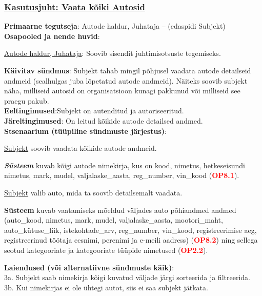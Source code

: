 \begin{shaded}
	\subsubsection{\underline{Kasutusjuht: Vaata kõiki Autosid}}
	\textbf{Primaarne tegutseja}: Autode haldur, Juhataja – (edaspidi Subjekt) \\
	\textbf{Osapooled ja nende huvid}: 
	\useDash
	\begin{myitemize}
		\item \underline{Autode haldur, Juhataja}: Soovib sisendit juhtimisotsuste tegemiseks.
	\end{myitemize}
	\textbf{Käivitav sündmus}: Subjekt tahab mingil põhjusel vaadata autode detailseid andmeid (sealhulgas juba lõpetatud autode andmeid). Näiteks soovib subjekt näha, milliseid autosid on organisatsioon kunagi pakkunud või milliseid see praegu pakub. \\
	\textbf{Eeltingimused}:Subjekt on autenditud ja autoriseeritud.\\
	\textbf{Järeltingimused}: On leitud kõikide autode detailsed andmed. \\
	\textbf{Stsenaarium (tüüpiline sündmuste järjestus)}:
	\begin{myenumerate}
		\item \underline{Subjekt} soovib vaadata kõikide autode andmeid.
		\item\textit \textbf{Süsteem} kuvab kõigi autode nimekirja, kus on kood, nimetus, hetkeseisundi nimetus, mark, mudel, valjalaske\_aasta, reg\_number, vin\_kood (\textbf{\textcolor{red}{OP8.1}}).
		\item \underline{Subjekt} valib auto, mida ta soovib detailsemalt vaadata.
		\item \textbf{Süsteem} kuvab vaatamiseks mõeldud väljades auto põhiandmed andmed (auto\_kood, nimetus, mark, mudel, valjalaske\_aasta, mootori\_maht, auto\_kütuse\_liik, istekohtade\_arv, reg\_number, vin\_kood, registreerimise aeg, registreerinud töötaja eesnimi, perenimi ja e-meili aadress) (\textbf{\textcolor{red}{OP8.2}}) ning sellega seotud kategooriate ja kategooriate tüüpide nimetused (\textbf{\textcolor{red}{OP2.2}}).
	\end{myenumerate}
	\textbf{Laiendused  (või alternatiivne sündmuste käik)}: \\
	\indent 3a. Subjekt saab nimekirja kõigi kuvatud väljade järgi sorteerida ja filtreerida. \\
	\indent 3b. Kui nimekirjas ei ole ühtegi autot, siis ei saa subjekt jätkata.
\end{shaded}

